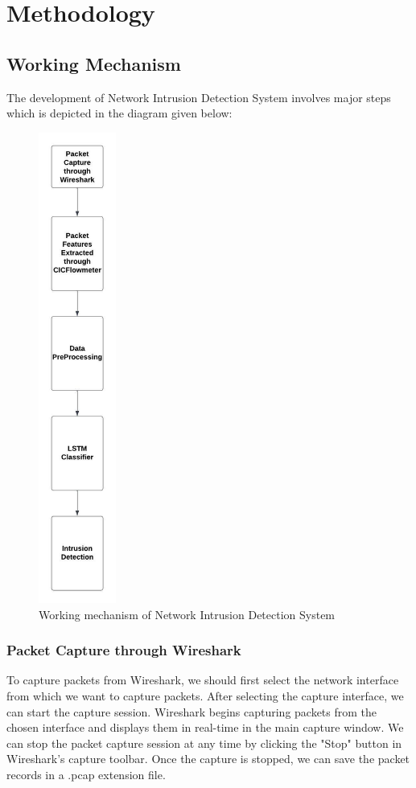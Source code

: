 \chapter{Methodology}
\section{Working Mechanism}
\vspace{-18pt}
The development of Network Intrusion Detection System involves major steps which is 
depicted in the diagram given below:
\begin{figure}[tbh] %
\begin{center}
	\includegraphics[width=1in]{images/workMan.jpg} 
	\caption{Working mechanism of Network Intrusion Detection System} %
	\label{Working mechanism of Network Intrusion Detection System} %
\end{center}
\end{figure}
\subsection{Packet Capture through Wireshark}
\vspace{-18pt}
To capture packets from Wireshark, we should first select the network interface from which we want to capture packets. After selecting the capture interface, we can start the capture session. Wireshark begins capturing packets from the chosen interface and displays them in real-time in the main capture window. We can stop the packet capture session at any time by clicking the "Stop" button in Wireshark's capture toolbar. Once the capture is stopped, we can save the packet records in a .pcap extension file.
